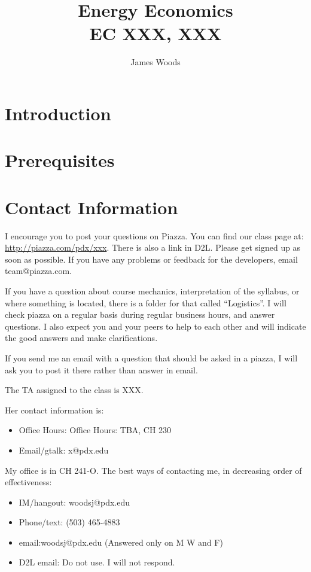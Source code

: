 \documentclass[letterpaper,10pt]{article}
\date{}
\title{Energy Economics\\ 
EC XXX, XXX\\
\Term}
\author{James Woods}
\begin{document}
\maketitle

\section{Introduction}

\section{Prerequisites}


\section{Contact Information}

I encourage you to post your questions on Piazza.  You can find our class page at: \url{http://piazza.com/pdx/xxx}.  There is also a link in D2L. Please get signed up as soon as possible. If you have any problems or feedback for the developers, email team@piazza.com.

If you have a question about course mechanics, interpretation of the
syllabus, or where something is located, there is a folder for
that called ``Logistics''. I will check piazza on a regular basis during regular business hours, and answer questions. I also expect you and your peers to help to each other and will indicate the good answers and make clarifications.  

If you send me an email with a question that should be asked in a piazza, I
will ask you to post it there rather than answer in email.


The TA assigned to the class is XXX. 

 Her contact information is:
 \begin{itemize}
 \item Office Hours: Office Hours: TBA, CH 230
 \item Email/gtalk: x@pdx.edu
 \end{itemize}
 

My office is in CH 241-O.  The best ways of contacting me, in
decreasing order of effectiveness:
\begin{itemize}
\item IM/hangout: woodsj@pdx.edu
\item Phone/text: (503) 465-4883
\item email:woodsj@pdx.edu (Answered only on M W and F)
\item D2L email: Do not use.  I will not respond.
\end{itemize}
\end{document}

